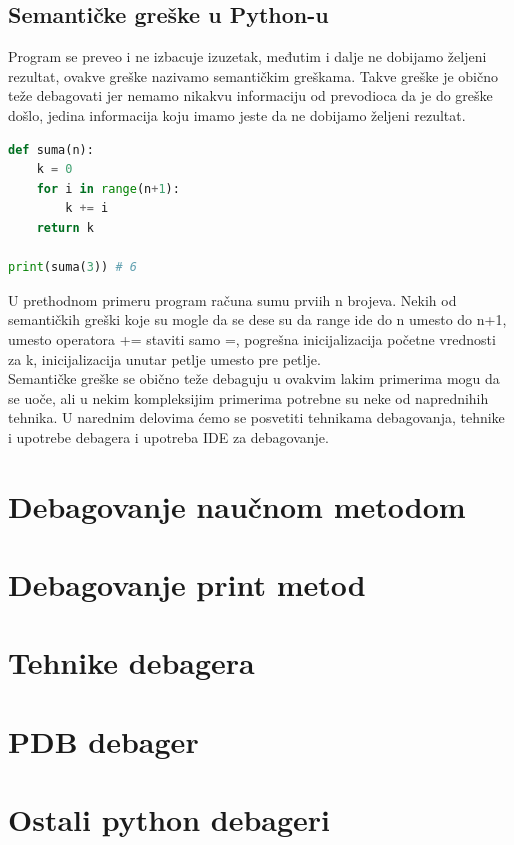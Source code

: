 \documentclass[a4paper]{article}
\begin{document}
\subsection{Semantičke greške u Python-u}	
Program se preveo i ne izbacuje izuzetak, međutim i dalje ne dobijamo željeni rezultat, ovakve greške nazivamo semantičkim greškama. Takve greške je obično teže debagovati jer nemamo nikakvu informaciju od prevodioca da je do greške došlo, jedina informacija koju imamo jeste da ne dobijamo željeni rezultat. 
\begin{lstlisting}[language = python, caption = {Računanje sume prvih n brojeva}]
def suma(n):
    k = 0
    for i in range(n+1):
        k += i
    return k

print(suma(3)) # 6
\end{lstlisting}
U prethodnom primeru program računa sumu prviih n brojeva. Nekih od semantičkih greški koje su mogle da se dese su da range ide do n umesto do n+1, umesto operatora += staviti samo =, pogrešna inicijalizacija početne vrednosti za k, inicijalizacija unutar petlje umesto pre petlje.\\
Semantičke greške se obično teže debaguju u ovakvim lakim primerima mogu da se uoče, ali u nekim kompleksijim primerima potrebne su neke od naprednihih tehnika. U narednim delovima ćemo se posvetiti tehnikama debagovanja, tehnike i upotrebe debagera i upotreba IDE za debagovanje.

\section{Debagovanje naučnom metodom}

\section{Debagovanje print metod}

\section{Tehnike debagera}

\section{PDB debager}

\section{Ostali python debageri}
\end{document}
